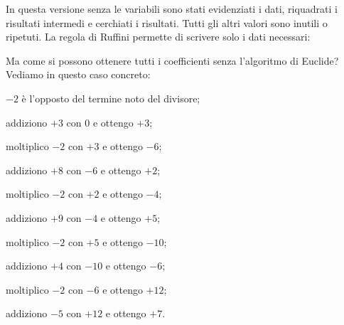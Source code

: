 In questa versione senza le variabili sono stati evidenziati i dati,
riquadrati i risultati intermedi e cerchiati i risultati.
Tutti gli altri valori sono inutili o ripetuti. La regola di Ruffini permette 
di scrivere solo i dati necessari:

\begin{inaccessibleblock}
\begin{center}
 
\end{center}
\end{inaccessibleblock}

Ma come si possono ottenere tutti i coefficienti senza l'algoritmo di Euclide?
Vediamo in questo caso concreto:
\begin{itemize*}
 \item $-2$ è l'opposto del termine noto del divisore;
 \item addiziono $+3$ con $0$ e ottengo $+3$;
 \item moltiplico $-2$ con $+3$ e ottengo $-6$;
 \item addiziono $+8$ con $-6$ e ottengo $+2$;
 \item moltiplico $-2$ con $+2$ e ottengo $-4$; 
 \item addiziono $+9$ con $-4$ e ottengo $+5$;
 \item moltiplico $-2$ con $+5$ e ottengo $-10$; 
 \item addiziono $+4$ con $-10$ e ottengo $-6$;
 \item moltiplico $-2$ con $-6$ e ottengo $+12$; 
 \item addiziono $-5$ con $+12$ e ottengo $+7$.
\end{itemize*}


